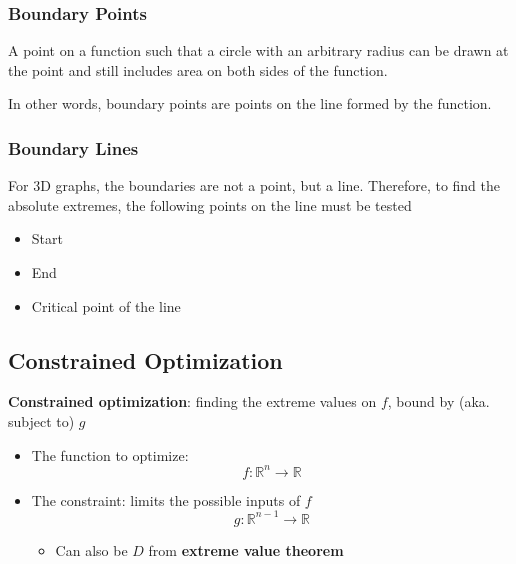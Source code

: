     \subsubsection{Boundary Points}

      A point on a function such that a circle with an arbitrary radius
      can be drawn at the point and still includes area on both sides of the
      function.

      In other words, boundary points are points on the line formed by the
      function.

    \subsubsection{Boundary Lines}

      For 3D graphs, the boundaries are not a point, but a line. Therefore,
      to find the absolute extremes, the following points on the line must be
      tested
      \begin{itemize}
        \item Start
        \item End
        \item Critical point of the line
      \end{itemize}

  \subsection{Constrained Optimization}

    \textbf{Constrained optimization}: finding the extreme values on $ f $,
    bound by (aka. subject to) $ g $

    \begin{itemize}
      \item The function to optimize:
      \begin{displaymath}
        f: \mathbb{R}^{n} \to \mathbb{R}
      \end{displaymath}

      \item The constraint: limits the possible inputs of $ f $
      \begin{displaymath}
        g: \mathbb{R}^{n - 1} \to \mathbb{R}
      \end{displaymath}
      \begin{itemize}
        \item Can also be $ D $ from \textbf{extreme value theorem}
      \end{itemize}
    \end{itemize}

